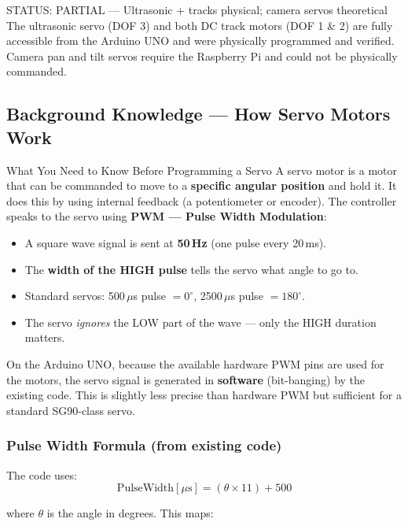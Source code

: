 \documentclass[12pt,a4paper]{article}
\begin{document}
\begin{warnbox}{STATUS: PARTIAL --- Ultrasonic + tracks physical; camera servos theoretical}
The ultrasonic servo (DOF 3) and both DC track motors (DOF 1 \& 2) are fully
accessible from the Arduino UNO and were physically programmed and verified.
Camera pan and tilt servos require the Raspberry Pi and could not be physically
commanded.
\end{warnbox}

\subsection{Background Knowledge --- How Servo Motors Work}

\begin{conceptbox}{What You Need to Know Before Programming a Servo}
A servo motor is a motor that can be commanded to move to a \textbf{specific
angular position} and hold it. It does this by using internal feedback (a
potentiometer or encoder). The controller speaks to the servo using
\textbf{PWM --- Pulse Width Modulation}:

\begin{itemize}[leftmargin=1.5em]
  \item A square wave signal is sent at \textbf{50\,Hz} (one pulse every 20\,ms).
  \item The \textbf{width of the HIGH pulse} tells the servo what angle to go to.
  \item Standard servos: 500\,$\mu$s pulse $= 0^\circ$, 2500\,$\mu$s pulse $= 180^\circ$.
  \item The servo \emph{ignores} the LOW part of the wave --- only the HIGH duration matters.
\end{itemize}

On the Arduino UNO, because the available hardware PWM pins are used for the
motors, the servo signal is generated in \textbf{software} (bit-banging) by the
existing code. This is slightly less precise than hardware PWM but sufficient for
a standard SG90-class servo.
\end{conceptbox}

\subsubsection{Pulse Width Formula (from existing code)}

The code uses:
\[
  \text{PulseWidth} [\mu\text{s}] = (\theta \times 11) + 500
\]

where $\theta$ is the angle in degrees. This maps:
\end{document}
